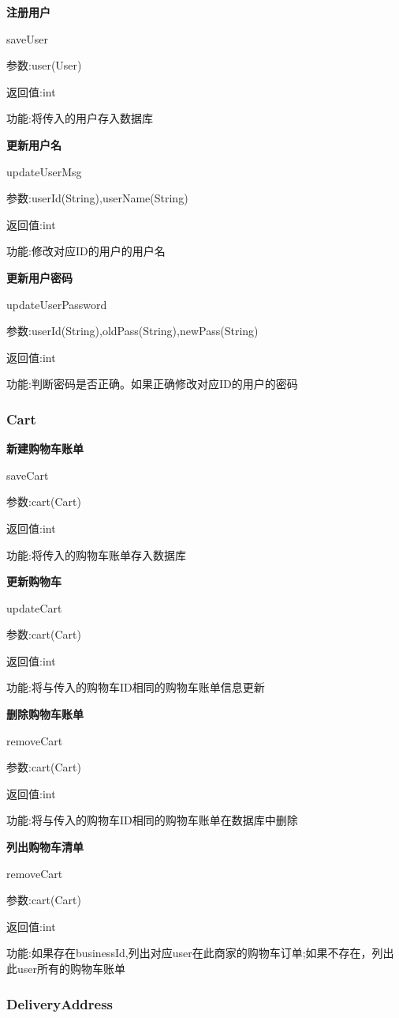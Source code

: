\textbf{注册用户}

saveUser

参数:user(User)

返回值:int

功能:将传入的用户存入数据库

\textbf{更新用户名}

updateUserMsg

参数:userId(String),userName(String)

返回值:int

功能:修改对应ID的用户的用户名

\textbf{更新用户密码}

updateUserPassword

参数:userId(String),oldPass(String),newPass(String)

返回值:int

功能:判断密码是否正确。如果正确修改对应ID的用户的密码

\subsubsection{Cart}
\textbf{新建购物车账单}

saveCart

参数:cart(Cart)

返回值:int

功能:将传入的购物车账单存入数据库

\textbf{更新购物车}

updateCart

参数:cart(Cart)

返回值:int

功能:将与传入的购物车ID相同的购物车账单信息更新

\textbf{删除购物车账单}

removeCart

参数:cart(Cart)

返回值:int

功能:将与传入的购物车ID相同的购物车账单在数据库中删除

\textbf{列出购物车清单}

removeCart

参数:cart(Cart)

返回值:int

功能:如果存在businessId,列出对应user在此商家的购物车订单;如果不存在，列出此user所有的购物车账单

\subsubsection{DeliveryAddress}

